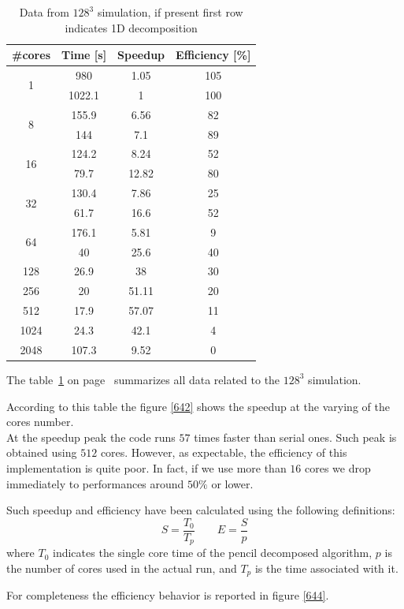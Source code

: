 \begin{table}[h]
\caption{Data from $128^{3}$ simulation, if present first row indicates 1D decomposition}
\begin{center}
\begin{tabular}{c c c c}
\toprule
\textbf{\#cores} & \textbf{Time [s]} & \textbf{Speedup} & \textbf{Efficiency [\%]} \\
\midrule
\multirow{2}{*}{1} & 980 & 1.05 & 105 \\
& 1022.1 & 1 & 100 \\
\hline
\multirow{2}{*}{8} & 155.9 & 6.56 & 82 \\
& 144 & 7.1 & 89 \\
\hline
\multirow{2}{*}{16} & 124.2 & 8.24 & 52 \\
& 79.7 & 12.82 & 80 \\
\hline
\multirow{2}{*}{32} & 130.4 & 7.86 & 25 \\
& 61.7 & 16.6 & 52 \\
\hline
\multirow{2}{*}{64} & 176.1 & 5.81 & 9 \\
& 40 & 25.6 & 40 \\
\hline
128 & 26.9 & 38 & 30 \\

256 & 20 & 51.11 & 20 \\

512 & 17.9 & 57.07 & 11 \\

1024 & 24.3 & 42.1 & 4 \\

2048 & 107.3 & 9.52 & 0 \\
\bottomrule
\end{tabular}
\end{center}
\label{64data}
\end{table}%


The table~\ref{64data} on page~\pageref{64data} summarizes all data related to the $128^{3}$ simulation. 


\par
According to this table the figure \ref{642} shows the speedup at the varying of the cores number. \\
At the speedup peak the code runs $57$ times faster than serial ones. Such peak is obtained using $512$ cores. However, as expectable, the efficiency of this implementation is quite poor. In fact, if we use more than $16$ cores we drop immediately to performances around $50\%$ or lower. 
\par
Such speedup and efficiency have been calculated using the following definitions:
\[
S = \frac{T_{0}}{T_{p}} \quad \quad E = \frac{S}{p}
\]
where $T_{0}$ indicates the single core time of the pencil decomposed algorithm, $p$ is the number of cores used in the actual run, and $T_{p}$ is the time associated with it. \\
\par
For completeness the efficiency behavior is reported in figure \ref{644}.

